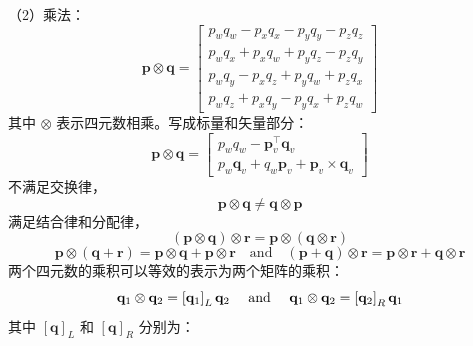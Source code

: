 （2）乘法：
\begin{equation}
\label{eqn:2.22}
\mathbf{p} \otimes \mathbf{q}=\left[ \begin{array}{c}{p_{w} q_{w}-p_{x} q_{x}-p_{y} q_{y}-p_{z} q_{z}} \\ {p_{w} q_{x}+p_{x} q_{w}+p_{y} q_{z}-p_{z} q_{y}} \\ {p_{w} q_{y}-p_{x} q_{z}+p_{y} q_{w}+p_{z} q_{x}} \\ {p_{w} q_{z}+p_{x} q_{y}-p_{y} q_{x}+p_{z} q_{w}}\end{array}\right]
\end{equation}
其中 $\otimes$ 表示四元数相乘。写成标量和矢量部分：
\begin{equation}
\label{eqn:2.23}
\mathbf{p} \otimes \mathbf{q}=\left[ \begin{array}{c}{p_{w} q_{w}-\mathbf{p}_{v}^{\top} \mathbf{q}_{v}} \\ {p_{w} \mathbf{q}_{v}+q_{w} \mathbf{p}_{v}+\mathbf{p}_{v} \times \mathbf{q}_{v}}\end{array}\right]
\end{equation}
不满足交换律，
\begin{equation}
\label{eqn:2.24}
\mathbf{p} \otimes \mathbf{q} \neq \mathbf{q} \otimes \mathbf{p}
\end{equation}
满足结合律和分配律，
\begin{equation}
\label{eqn:2.25}
(\mathbf{p} \otimes \mathbf{q}) \otimes \mathbf{r}=\mathbf{p} \otimes(\mathbf{q} \otimes \mathbf{r})
\end{equation}
\begin{equation}
\label{eqn:2.26}
\mathbf{p} \otimes(\mathbf{q}+\mathbf{r})=\mathbf{p} \otimes \mathbf{q}+\mathbf{p} \otimes \mathbf{r} \quad  
\text{and}
\quad(\mathbf{p}+\mathbf{q}) \otimes \mathbf{r}=\mathbf{p} \otimes \mathbf{r}+\mathbf{q} \otimes \mathbf{r}
\end{equation}
两个四元数的乘积可以等效的表示为两个矩阵的乘积：
\begin{equation}
\label{eqn:2.27}
\setlength{\abovedisplayskip}{6pt}
\setlength{\belowdisplayskip}{6pt}
\mathbf{q}_{1} \otimes \mathbf{q}_{2}=\left[\mathbf{q}_{1}\right]_{L} \mathbf{q}_{2} \quad \text { and } \quad \mathbf{q}_{1} \otimes \mathbf{q}_{2}=\left[\mathbf{q}_{2}\right]_{R} \mathbf{q}_{1}
\end{equation}
其中 $\left[\mathbf{q}\right]_{L}$ 和 $\left[\mathbf{q}\right]_{R}$ 分别为：
